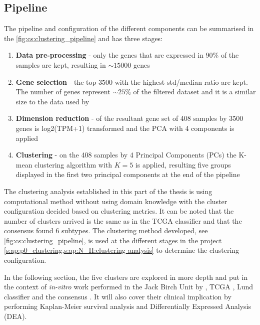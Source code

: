 \subsection{Pipeline}

The pipeline and configuration of the different components can be summarised in the \cref{fig:cs:clustering_pipeline} and has three stages:
\begin{enumerate}
    \item \textbf{Data pre-processing} - only the genes that are expressed in 90\% of the samples are kept, resulting in $\sim15000$ genes
    \item \textbf{Gene selection} - the top $3500$ with the highest std/median ratio are kept. The number of genes represent $\sim25\%$ of the filtered dataset and it is a similar size to the data used by \citet{Robertson2017-mg}
    \item \textbf{Dimension reduction} - of the resultant gene set of 408 samples by 3500 genes is log2(TPM+1) transformed and the PCA with 4 components is applied
    \item \textbf{Clustering} - on the 408 samples by 4 Principal Components (PCs) the K-mean clustering algorithm with $K=5$ is applied, resulting  five groups displayed in the first two principal components at the end of the pipeline
\end{enumerate}

The clustering analysis established in this part of the thesis is using  computational method without using domain knowledge with the cluster configuration decided based on clustering metrics. It can be noted that the number of clusters arrived is the same as in the TCGA classifier \citet{Robertson2017-mg} and that the consensus \citet{Kamoun2020-tj} found 6 subtypes. The clustering method developed, see \cref{fig:cs:clustering_pipeline}, is used at the different stages in the project \cref{s:ap:p0_clustering,s:ap:N_II:clustering analysis} to determine the clustering configuration.

In the following section, the five clusters are explored in more depth and put in the context of \textit{in-vitro} work performed in the Jack Birch Unit by \citet{Baker2022-bj}, TCGA \citet{Robertson2017-mg}, Lund classifier \citet{Marzouka2018-ge} and the consensus \citet{Kamoun2020-tj}. It will also cover their clinical implication by performing Kaplan-Meier survival analysis and Differentially Expressed Analysis (DEA).

